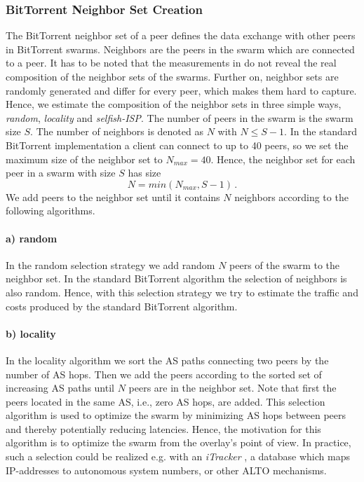 \subsubsection{BitTorrent Neighbor Set Creation}

The BitTorrent neighbor set of a peer defines the data exchange with other peers in BitTorrent swarms. Neighbors are the peers in the swarm which are connected to a peer. It has to be noted that the measurements in \cite{Hossfeld2011} do not reveal the real composition of the neighbor sets of the swarms. Further on, neighbor sets are randomly generated and differ for every peer, which makes them hard to capture. Hence, we estimate the composition of the neighbor sets in three simple ways, \textit{random}, \textit{locality} and \textit{selfish-ISP}.
The number of peers in the swarm is the swarm size $S$. The number of neighbors is denoted as $N$ with $N\leq S-1$. In the standard BitTorrent implementation a client can connect to up to 40 peers, so we set the maximum size of the neighbor set to $N_{max}=40$. Hence, the neighbor set for each peer in a swarm with size $S$ has size
\begin{equation}
N=min(N_{max},S-1) \, .
\end{equation}
We add peers to the neighbor set until it contains $N$ neighbors according to the following algorithms.
\paragraph{a) random}
In the random selection strategy we add random $N$ peers of the swarm to the neighbor set. In the standard BitTorrent algorithm the selection of neighbors is also random. Hence, with this selection strategy we try to estimate the traffic and costs produced by the standard BitTorrent algorithm.
\paragraph{b) locality}
In the locality algorithm we sort the AS paths connecting two peers by the number of AS hops. Then we add the peers according to the sorted set of increasing AS paths until $N$ peers are in the neighbor set. Note that first the peers located in the same AS, i.e., zero AS hops, are added. This selection algorithm is used to optimize the swarm by minimizing AS hops between peers and thereby potentially reducing latencies. Hence, the motivation for this algorithm is to optimize the swarm from the overlay's point of view.
In practice, such a selection could be realized e.g. with an \emph{iTracker} \cite{Xie2008}, a database which maps IP-addresses to autonomous system numbers, or other ALTO mechanisms.
